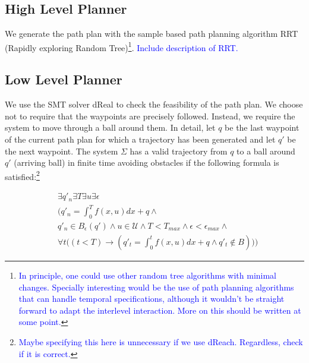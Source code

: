 \documentclass[12pt]{article}
\newcommand\fran[1]{\textcolor{blue}{#1}}
\newcommand\ffran[1]{\textcolor{blue}{\footnote{\fran{#1}}}}
\begin{document}
\subsection{High Level Planner}
\label{sub:high_level_planner}

We generate the path plan with the sample based path planning algorithm RRT (Rapidly exploring Random Tree)\ffran{In principle, one could use other random tree algorithms with minimal changes. Specially interesting would be the use of path planning algorithms that can handle temporal specifications, although it wouldn't be straight forward to adapt the interlevel interaction. More on this should be written at some point.}. \fran{Include description of RRT.}

\subsection{Low Level Planner}
\label{sub:low_level_planner}

We use the SMT solver dReal to check the feasibility of the path plan. We choose not to require that the waypoints are precisely followed. Instead, we require the system to move through a ball around them. In detail, let $q$ be the last waypoint of the current path plan for which a trajectory has been generated and let $q'$ be the next waypoint. The system $\Sigma$ has a valid trajectory from $q$ to a ball around $q'$ (arriving ball) in finite time avoiding obstacles if the following formula is satisfied:\ffran{Maybe specifying this here is unnecessary if we use dReach. Regardless, check if it is correct.}

\begin{equation}
    \label{eq:reach_check}
    \begin{split}
        &\exists q'_n \exists T \exists u \exists \epsilon \\
        &\bigg(
            q'_n = \int_{0}^{T} f(x, u) dx + q \land \\
        &q'_n \in B_{\epsilon}(q') \land 
            u \in \mathcal{U} \land
            T < T_{max} \land
            \epsilon < \epsilon_{max} \land \\
        &\forall t \Big((t < T) \rightarrow 
            (q'_t = \int_{0}^{t} f(x, u) dx + q \land 
            q'_t \notin B )\Big)
        \bigg)
    \end{split}
\end{equation}
\end{document}
